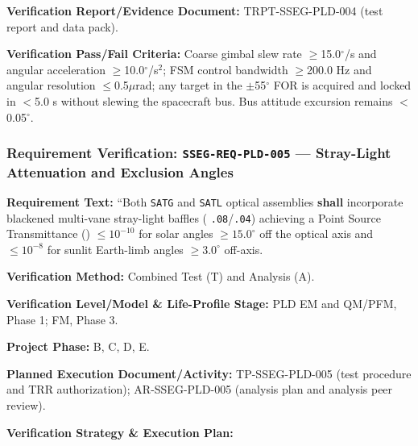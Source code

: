 \par\textbf{Verification Report/Evidence Document:} TRPT-SSEG-PLD-004 (test report and data pack).
\par\textbf{Verification Pass/Fail Criteria:} Coarse gimbal slew rate $\ge$15.0$^\circ$/s and angular acceleration $\ge$10.0$^\circ$/s$^2$; FSM control bandwidth $\ge$200.0 Hz and angular resolution $\le$0.5$\mu$rad; any target in the $\pm$55$^\circ$ FOR is acquired and locked in $<$5.0 s without slewing the spacecraft bus. Bus attitude excursion remains $<$0.05$^\circ$.
\par\medskip
\subsubsection{Requirement Verification: \texttt{SSEG-REQ-PLD-005} --- Stray-Light Attenuation and Exclusion Angles}
\label{ver:SSEG-REQ-PLD-005}
\textbf{Requirement Text:} ``Both \texttt{SATG} and \texttt{SATL} optical assemblies \textbf{shall} incorporate blackened multi-vane stray-light baffles ( \texttt{.08}/\texttt{.04}) achieving a Point Source Transmittance () $\le 10^{-10}$ for solar angles $\ge 15.0^\circ$ off the optical axis and $\le 10^{-8}$ for sunlit Earth-limb angles $\ge 3.0^\circ$ off-axis.
\par\textbf{Verification Method:} Combined Test (T) and Analysis (A).
\par\textbf{Verification Level/Model \& Life-Profile Stage:} PLD EM and QM/PFM, Phase 1; FM, Phase 3.
\par\textbf{Project Phase:} B, C, D, E.
\par\textbf{Planned Execution Document/Activity:} TP-SSEG-PLD-005 (test procedure and TRR authorization); AR-SSEG-PLD-005 (analysis plan and analysis peer review).
\par\textbf{Verification Strategy \& Execution Plan:}
